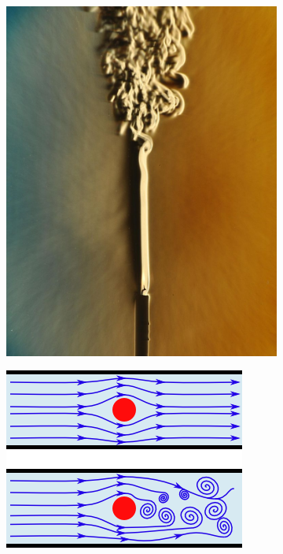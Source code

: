 \documentclass[11pt,a4paper]{article}
\begin{document}
\begin{figure}[H]
\centering
\begin{subfigure}{.25\textwidth}
  \centering
  \includegraphics[width=.95\linewidth]{imgs/p9/flows.jpg}  
\end{subfigure}
\begin{subfigure}{.35\textwidth}
  \centering
  \includegraphics[width=.95\linewidth]{imgs/p9/flows.png}  

\end{subfigure}
\end{figure}
\end{document}
